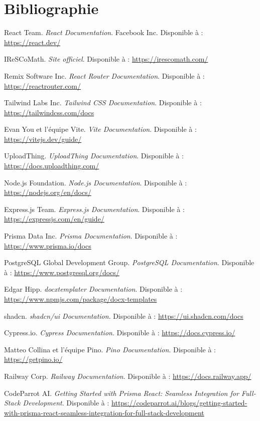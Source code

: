 \chapter*{Bibliographie}
\begin{thebibliography}{99}

React Team. \emph{React Documentation}. Facebook Inc. Disponible à : \url{https://react.dev/}

IReSCoMath. \emph{Site officiel}. Disponible à : \url{https://irescomath.com/}

Remix Software Inc. \emph{React Router Documentation}. Disponible à : \url{https://reactrouter.com/}

Tailwind Labs Inc. \emph{Tailwind CSS Documentation}. Disponible à : \url{https://tailwindcss.com/docs}

Evan You et l'équipe Vite. \emph{Vite Documentation}. Disponible à : \url{https://vitejs.dev/guide/}

UploadThing. \emph{UploadThing Documentation}. Disponible à : \url{https://docs.uploadthing.com/}

Node.js Foundation. \emph{Node.js Documentation}. Disponible à : \url{https://nodejs.org/en/docs/}

Express.js Team. \emph{Express.js Documentation}. Disponible à : \url{https://expressjs.com/en/guide/}

Prisma Data Inc. \emph{Prisma Documentation}. Disponible à : \url{https://www.prisma.io/docs}

PostgreSQL Global Development Group. \emph{PostgreSQL Documentation}. Disponible à : \url{https://www.postgresql.org/docs/}

Edgar Hipp. \emph{docxtemplater Documentation}. Disponible à : \url{https://www.npmjs.com/package/docx-templates}

shadcn. \emph{shadcn/ui Documentation}. Disponible à : \url{https://ui.shadcn.com/docs}

Cypress.io. \emph{Cypress Documentation}. Disponible à : \url{https://docs.cypress.io/}

Matteo Collina et l'équipe Pino. \emph{Pino Documentation}. Disponible à : \url{https://getpino.io/}

Railway Corp. \emph{Railway Documentation}. Disponible à : \url{https://docs.railway.app/}

CodeParrot AI. \emph{Getting Started with Prisma React: Seamless Integration for Full-Stack Development}. Disponible à : \url{https://codeparrot.ai/blogs/getting-started-with-prisma-react-seamless-integration-for-full-stack-development}

\end{thebibliography}